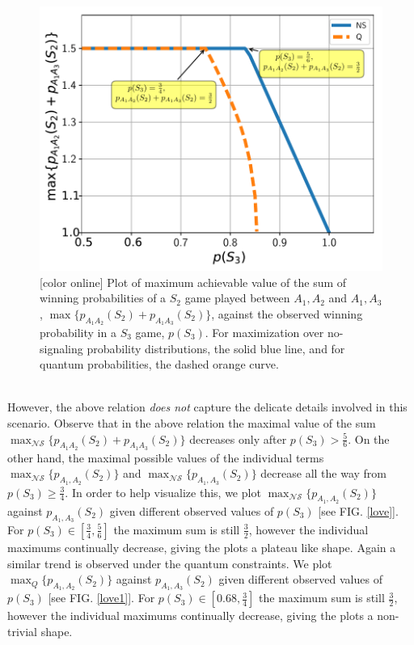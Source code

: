 \documentclass[%
 reprint,
 amsmath,amssymb,
 aps,
]{revtex4-1}
\theoremstyle{plain}
\begin{document}
\begin{figure} 
\includegraphics[scale=0.6]{images/Mono_vs_Sn.pdf}
\caption{[color online] Plot of maximum achievable value of the sum of winning probabilities of a $S_2$ game played between $A_1,A_2$ and $A_1,A_3$, $\max \{p_{A_1A_2}(S_2)+p_{A_1A_3}(S_2)\}$,  against the observed winning probability in a $S_3$ game, $p(S_3)$. For maximization over no-signaling probability distributions, the solid blue line, and for quantum probabilities, the dashed orange curve.
\label{monovssn}
}
\end{figure}\\
However, the above relation \textit{does not} capture the delicate details involved in this scenario.
Observe that in the above relation the maximal value of the sum $\max_{\mathcal{NS}}\{p_{A_1A_2}(S_2)+p_{A_1A_3}(S_2)\}$ decreases only after $p(S_3) > \frac{5}{6}$. On the other hand, the maximal possible values of the individual terms $\max_{\mathcal{NS}}\{p_{A_1,A_2}(S_2)\}$ and $\max_{\mathcal{NS}}\{p_{A_1,A_3}(S_2)\}$ decrease all the way from $p(S_3)\geq \frac{3}{4}$. In order to help visualize this, we plot $\max_{\mathcal{NS}}\{p_{A_1,A_2}(S_2)\}$ against $p_{A_1,A_3}(S_2)$ given different observed values of $p(S_3)$ [see FIG. \ref{love}]. For $p(S_3) \in [\frac{3}{4},\frac{5}{6}]$ the maximum sum is still $\frac{3}{2}$, however the individual maximums continually decrease, giving the plots a plateau like shape. 
Again a similar trend is observed under the quantum constraints. We plot $\max_{Q}\{p_{A_1,A_2}(S_2)\}$ against $p_{A_1,A_3}(S_2)$ given different observed values of $p(S_3)$ [see FIG. \ref{love1}]. For $p(S_3) \in [0.68,\frac{3}{4}]$ the maximum sum is still $\frac{3}{2}$, however the individual maximums continually decrease, giving the plots a non-trivial shape.  
\end{document}
